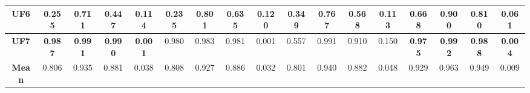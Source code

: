 \begin{table*}[t]
\begin{tabular}{cc|c|c|c|c|c|c|c|c|c|c|c|c|c|c|c}
\multicolumn{1}{c|}{\textbf{UF6}}   & 0.255          & 0.711          & 0.447          & 0.114          & 0.235          & 0.801          & 0.635          & 0.120          & 0.349          & 0.767          & 0.568          & 0.113          & \textbf{0.668} & \textbf{0.900} & \textbf{0.810} & \textbf{0.061} \\ \hline
\multicolumn{1}{c|}{\textbf{UF7}}   & \textbf{0.987} & \textbf{0.991} & \textbf{0.990} & \textbf{0.001} & 0.980          & 0.983          & 0.981          & 0.001          & 0.557          & 0.991          & 0.910          & 0.150          & \textbf{0.975} & \textbf{0.992} & \textbf{0.988} & \textbf{0.004} \\ \hline
\multicolumn{1}{c|}{\textbf{Mean}}  & 0.806          & 0.935          & 0.881          & 0.038          & 0.808          & 0.927          & 0.886          & 0.032          & 0.801          & 0.940          & 0.882          & 0.048          & 0.929          & 0.963          & 0.949          & 0.009          \\ \hline
\end{tabular}%
\end{table*}



